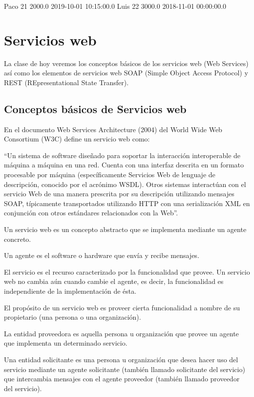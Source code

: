 Paco 21 2000.0 2019-10-01 10:15:00.0 Luis 22 3000.0 2018-11-01 00:00:00.0

\clearpage


\chapter{Servicios web}

La clase de hoy veremos los conceptos básicos de los servicios web (Web Services) así como los elementos de servicios web SOAP (Simple Object Access Protocol) y REST (REpresentational State Transfer).

\section{Conceptos básicos de Servicios web}

En el documento Web Services Architecture (2004) del World Wide Web Consortium (W3C) define un servicio web como:

“Un sistema de software diseñado para soportar la interacción interoperable de máquina a máquina en una red. Cuenta con una interfaz descrita en un formato procesable por máquina (específicamente Servicios Web de lenguaje de descripción, conocido por el acrónimo WSDL). Otros sistemas interactúan con el servicio Web de una manera prescrita por su descripción utilizando mensajes SOAP, típicamente transportados utilizando HTTP con una serialización XML en conjunción con otros estándares relacionados con la Web”.

Un servicio web es un concepto abstracto que se implementa mediante un agente concreto.

Un agente es el software o hardware que envía y recibe mensajes.

El servicio es el recurso caracterizado por la funcionalidad que provee. Un servicio web no cambia aún cuando cambie el agente, es decir, la funcionalidad es independiente de la implementación de ésta.

El propósito de un servicio web es proveer cierta funcionalidad a nombre de su propietario (una persona o una organización).

La entidad proveedora es aquella persona u organización que provee un agente que implementa un determinado servicio.

Una entidad solicitante es una persona u organización que desea hacer uso del servicio mediante un agente solicitante (también llamado solicitante del servicio) que intercambia mensajes con el agente proveedor (también llamado  proveedor del servicio).


